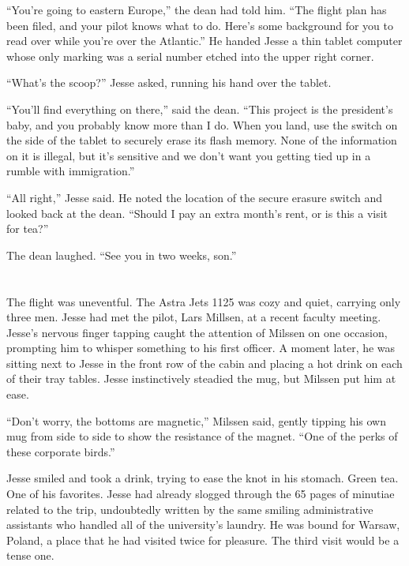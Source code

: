 \documentclass[12pt]{book}
\begin{document}
``You're going to eastern Europe,'' the dean had told him.  ``The flight plan has been filed, and your pilot knows what to do.  Here's some background for you to read over while you're over the Atlantic.''  He handed Jesse a thin tablet computer whose only marking was a serial number etched into the upper right corner.

``What's the scoop?'' Jesse asked, running his hand over the tablet.

``You'll find everything on there,'' said the dean.  ``This project is the president's baby, and you probably know more than I do.  When you land, use the switch on the side of the tablet to securely erase its flash memory.  None of the information on it is illegal, but it's sensitive and we don't want you getting tied up in a rumble with immigration.''

``All right,'' Jesse said.  He noted the location of the secure erasure switch and looked back at the dean.  ``Should I pay an extra month's rent, or is this a visit for tea?''

The dean laughed.  ``See you in two weeks, son.''

\chapter{}

The flight was uneventful.  The Astra Jets 1125 was cozy and quiet, carrying only three men.  Jesse had met the pilot, Lars Millsen, at a recent faculty meeting.  Jesse's nervous finger tapping caught the attention of Milssen on one occasion, prompting him to whisper something to his first officer.  A moment later, he was sitting next to Jesse in the front row of the cabin and placing a hot drink on each of their tray tables.  Jesse instinctively steadied the mug, but Milssen put him at ease.

``Don't worry, the bottoms are magnetic,'' Milssen said, gently tipping his own mug from side to side to show the resistance of the magnet.  ``One of the perks of these corporate birds.''

Jesse smiled and took a drink, trying to ease the knot in his stomach.  Green tea.  One of his favorites.  Jesse had already slogged through the 65 pages of minutiae related to the trip, undoubtedly written by the same smiling administrative assistants who handled all of the university's laundry.  He was bound for Warsaw, Poland, a place that he had visited twice for pleasure.  The third visit would be a tense one.
\end{document}
